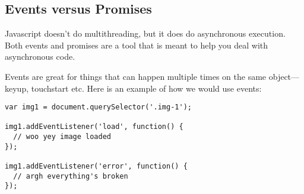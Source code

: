 \subsection{Events versus Promises}
Javascript doesn't do multithreading, but it does do asynchronous execution. Both events and promises are a tool that is meant to help you deal with asynchronous code. 

Events are great for things that can happen multiple times on the same object—keyup, touchstart etc. Here is an example of how we would use events: 
\begin{lstlisting}
var img1 = document.querySelector('.img-1');

img1.addEventListener('load', function() {
  // woo yey image loaded
});

img1.addEventListener('error', function() {
  // argh everything's broken
});

\end{lstlisting}

